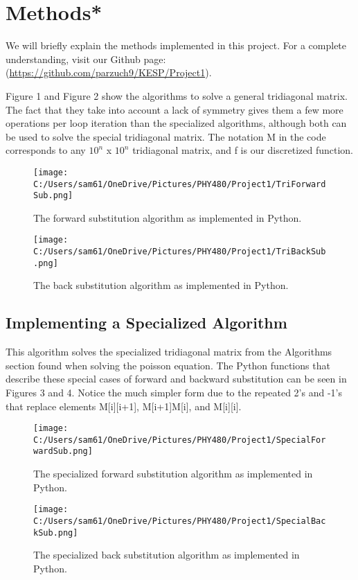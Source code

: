 \documentclass[10pt,showpacs,preprintnumbers,footinbib,amsmath,amssymb,aps,prl,twocolumn,groupedaddress,superscriptaddress,showkeys]{revtex4-1}
\begin{document}
\section{Methods*}

We will briefly explain the methods implemented in this project. For a complete understanding, visit our Github page: (\url{https://github.com/parzuch9/KESP/Project1}).

Figure 1 and Figure 2 show the algorithms to solve a general tridiagonal matrix. The fact that they take into account a lack of symmetry gives them a few more operations per loop iteration than the specialized algorithms, although both can be used to solve the special tridiagonal matrix. The notation M in the code corresponds to any $10^{n}$ x $10^{n}$ tridiagonal matrix, and f is our discretized function.

\begin{figure}[!ht]
	\centering
	\texttt{[image: C:/Users/sam61/OneDrive/Pictures/PHY480/Project1/TriForwardSub.png]}
	\caption{ The forward substitution algorithm as implemented in Python.  }
\end{figure}

\begin{figure}[!ht]
	\centering
	\texttt{[image: C:/Users/sam61/OneDrive/Pictures/PHY480/Project1/TriBackSub.png]}
	\caption{ The back substitution algorithm as implemented in Python.  }
\end{figure}

	\subsection{Implementing a Specialized Algorithm}
This algorithm solves the specialized tridiagonal matrix from the Algorithms section found when solving the poisson equation. The Python functions that describe these special cases of forward and backward substitution can be seen in Figures 3 and 4. Notice the much simpler form due to the repeated 2's and -1's that replace elements M[i][i+1], M[i+1]M[i], and M[i][i].

\begin{figure}[!ht]
	\centering
	\texttt{[image: C:/Users/sam61/OneDrive/Pictures/PHY480/Project1/SpecialForwardSub.png]}
	\caption{ The specialized forward substitution algorithm as implemented in Python.  }
\end{figure}

\begin{figure}[!ht]
	\centering
	\texttt{[image: C:/Users/sam61/OneDrive/Pictures/PHY480/Project1/SpecialBackSub.png]}
	\caption{ The specialized back substitution algorithm as implemented in Python.  }
\end{figure}
\end{document}
